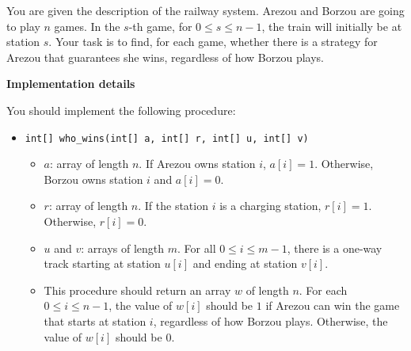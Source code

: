 You are given the description of the railway system. Arezou and Borzou are going to play $n$ games. In the $s$-th game, for $0 \le s \le n - 1$, the train will initially be at station $s$. Your task is to find, for each game, whether there is a strategy for Arezou that guarantees she wins, regardless of how Borzou plays.

\textbf{Implementation details}

You should implement the following procedure:

\begin{itemize}
\item \texttt{int[] who\_wins(int[] a, int[] r, int[] u, int[] v)}
\begin{itemize}
\item $a$: array of length $n$. If Arezou owns station $i$, $a[i] = 1$. Otherwise, Borzou owns station $i$ and $a[i] = 0$.
\item $r$: array of length $n$. If the station $i$ is a charging station, $r[i] = 1$. Otherwise, $r[i] = 0$.
\item $u$ and $v$: arrays of length $m$. For all $0 \leq i \leq m - 1$, there is a one-way track starting at station $u[i]$ and ending at station $v[i]$.
\item This procedure should return an array $w$ of length $n$. For each $0 \leq i \leq n-1$, the value of $w[i]$ should be $1$ if Arezou can win the game that starts at station $i$, regardless of how Borzou plays. Otherwise, the value of $w[i]$ should be $0$.
\end{itemize}
\end{itemize}

